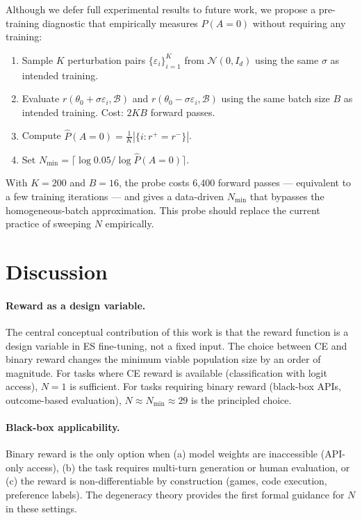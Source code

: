 \documentclass[11pt]{article}
\theoremstyle{definition}
\theoremstyle{remark}
\newcommand{\Nmin}{N_{\mathrm{min}}}
\begin{document}
Although we defer full experimental results to future work, we propose a pre-training diagnostic that empirically measures $P(A=0)$ without requiring any training:

\begin{enumerate}[leftmargin=*]
  \item Sample $K$ perturbation pairs $\{\varepsilon_i\}_{i=1}^K$ from $\mathcal{N}(0, I_d)$ using the same $\sigma$ as intended training.
  \item Evaluate $r(\theta_0 + \sigma\varepsilon_i, \mathcal{B})$ and $r(\theta_0 - \sigma\varepsilon_i, \mathcal{B})$ using the same batch size $B$ as intended training. Cost: $2KB$ forward passes.
  \item Compute $\hat P(A=0) = \frac{1}{K}|\{i : r^+ = r^-\}|$.
  \item Set $\Nmin = \lceil \log 0.05 / \log \hat P(A=0) \rceil$.
\end{enumerate}

With $K = 200$ and $B = 16$, the probe costs 6,400 forward passes --- equivalent to a few training iterations --- and gives a data-driven $\Nmin$ that bypasses the homogeneous-batch approximation. This probe should replace the current practice of sweeping $N$ empirically.

\section{Discussion}
\label{sec:discussion}

\paragraph{Reward as a design variable.}
The central conceptual contribution of this work is that the reward function is a design variable in ES fine-tuning, not a fixed input. The choice between CE and binary reward changes the minimum viable population size by an order of magnitude. For tasks where CE reward is available (classification with logit access), $N=1$ is sufficient. For tasks requiring binary reward (black-box APIs, outcome-based evaluation), $N \approx \Nmin \approx 29$ is the principled choice.

\paragraph{Black-box applicability.}
Binary reward is the only option when (a) model weights are inaccessible (API-only access), (b) the task requires multi-turn generation or human evaluation, or (c) the reward is non-differentiable by construction (games, code execution, preference labels). The degeneracy theory provides the first formal guidance for $N$ in these settings.
\end{document}
